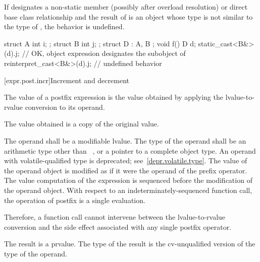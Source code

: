 \pnum
If  designates a non-static member
(possibly after overload resolution)
or direct base class relationship and
the result of  is an object whose type
is not similar to the type of ,
the behavior is undefined.
%
%
%
%
%
\begin{example}
\begin{codeblock}
struct A { int i; };
struct B { int j; };
struct D : A, B {};
void f() {
  D d;
  static_cast<B&>(d).j;             // OK, object expression designates the  subobject of 
  reinterpret_cast<B&>(d).j;        // undefined behavior
}
\end{codeblock}
\end{example}

[expr.post.incr]{Increment and decrement}

\pnum
{}%
%
%
%
The value of a postfix \tcode{++} expression is the value obtained by
applying the lvalue-to-rvalue conversion to its operand.
\begin{note}
The value obtained is a copy of the original value.
\end{note}
The operand shall be a modifiable lvalue. The type of the operand shall
be an arithmetic type other than \cv{}~,
or a pointer to a complete object type.
An operand with volatile-qualified type is deprecated;
see~\ref{depr.volatile.type}.
The value of the operand object is modified
as if it were the operand of the prefix \tcode{++} operator.
The
%
value computation of the \tcode{++} expression is sequenced before the
modification of the operand object. With respect to an
indeterminately-sequenced function call, the operation of postfix
\tcode{++} is
a single evaluation.
\begin{note}
Therefore, a function call cannot intervene between the
lvalue-to-rvalue conversion and the side effect associated with any
single postfix \tcode{++} operator.
\end{note}
The result is a prvalue. The type of the result is the cv-unqualified
version of the type of the operand.

